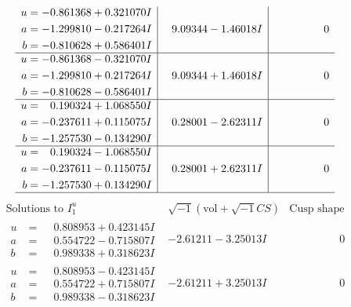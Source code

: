 \documentclass[1p]{elsarticle_modified}
\theoremstyle{definition}
\newcommand{\I}{\sqrt{-1}}
\begin{document}
$$\begin{array}{c|c|c}
\begin{aligned}
u &= -0.861368 + 0.321070 I \\
a &= -1.299810 - 0.217264 I \\
b &= -0.810628 + 0.586401 I\end{aligned}
 & \phantom{-}9.09344 - 1.46018 I & \phantom{-0.000000 } 0 \\ \hline\begin{aligned}
u &= -0.861368 - 0.321070 I \\
a &= -1.299810 + 0.217264 I \\
b &= -0.810628 - 0.586401 I\end{aligned}
 & \phantom{-}9.09344 + 1.46018 I & \phantom{-0.000000 } 0 \\ \hline\begin{aligned}
u &= \phantom{-}0.190324 + 1.068550 I \\
a &= -0.237611 + 0.115075 I \\
b &= -1.257530 - 0.134290 I\end{aligned}
 & \phantom{-}0.28001 - 2.62311 I & \phantom{-0.000000 } 0 \\ \hline\begin{aligned}
u &= \phantom{-}0.190324 - 1.068550 I \\
a &= -0.237611 - 0.115075 I \\
b &= -1.257530 + 0.134290 I\end{aligned}
 & \phantom{-}0.28001 + 2.62311 I & \phantom{-0.000000 } 0\\
 \hline 
 \end{array}$$\newpage$$\begin{array}{c|c|c}  
\text{Solutions to }I^u_{1}& \I (\text{vol} + \sqrt{-1}CS) & \text{Cusp shape}\\
 \hline 
\begin{aligned}
u &= \phantom{-}0.808953 + 0.423145 I \\
a &= \phantom{-}0.554722 - 0.715807 I \\
b &= \phantom{-}0.989338 + 0.318623 I\end{aligned}
 & -2.61211 - 3.25013 I & \phantom{-0.000000 } 0 \\ \hline\begin{aligned}
u &= \phantom{-}0.808953 - 0.423145 I \\
a &= \phantom{-}0.554722 + 0.715807 I \\
b &= \phantom{-}0.989338 - 0.318623 I\end{aligned}
 & -2.61211 + 3.25013 I & \phantom{-0.000000 } 0 \\ \hline\begin{aligned}

\end{aligned}
\end{array}$$
\end{document}
